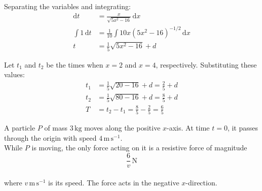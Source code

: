 \documentclass[leqno]{article}
\begin{document}
\begin{enumerate}[
  label=\textbf{\arabic*.},
  leftmargin=*,
  topsep=0pt,
  partopsep=0pt,
  parsep=0pt
]
\begin{djsSolution}
\begin{enumerate}[label=\textbf{(\alph*)}, start=1]
Separating the variables and integrating:
\begin{align*}
\mathrm{d}t&=\frac{x}{\sqrt{5x^2-16}}\,\mathrm{d}x\\
\int 1\,\mathrm{d}t&=\frac{1}{10}\int 10x(5x^2-16)^{-1/2}\,\mathrm{d}x\\
t&=\frac15\sqrt{5x^2-16}+d
\end{align*}

Let \(t_1\) and \(t_2\) be the times when \(x=2\) and \(x=4\), respectively. Substituting these values:
\begin{align*}
t_1&=\frac15\sqrt{20-16}+d=\frac25+d\\
t_2&=\frac15\sqrt{80-16}+d=\frac85+d\\
T&=t_2-t_1=\frac85-\frac25=\frac65
\end{align*}
\end{enumerate}
\end{djsSolution}

\newpage

\questionitem

A particle $P$ of mass $3\,\mathrm{kg}$ moves along the positive $x$-axis. At time $t=0$, it passes through the origin with speed $4\,\mathrm{m\,s^{-1}}$. \\

While $P$ is moving, the only force acting on it is a resistive force of magnitude
\[
\frac{6}{v}\,\mathrm{N}
\] \\
where $v\,\mathrm{m\,s^{-1}}$ is its speed. The force acts in the negative $x$-direction. \\


\end{enumerate}
\end{document}
